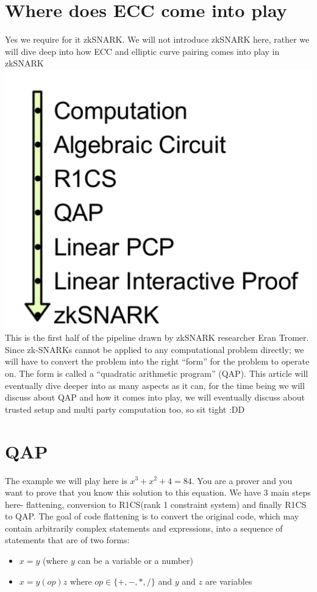 \documentclass[12pt,letterpaper]{article}
\begin{document}
\section{Where does ECC come into play}
Yes we require for it zkSNARK. We will not introduce zkSNARK here, rather we will dive deep into how ECC and elliptic curve pairing comes into play in zkSNARK\\
\includegraphics[scale=0.7]{Eren.PNG}\\
This is the first half of the pipeline drawn by zkSNARK researcher Eran Tromer. Since zk-SNARKs cannot be applied to any computational problem directly; we will have to convert the problem into the right “form” for the problem to operate on. The form is called a “quadratic arithmetic program” (QAP). This article will eventually dive deeper into as many aspects as it can, for the time being we will discuss about QAP and how it comes into play, we will eventually discuss about trusted setup and multi party computation too, so sit tight :DD 
\section{QAP}
The example we will play here is $x^3+x^2+4=84$. You are a prover and you want to prove that you know this solution to this equation. We have 3 main steps here- flattening, conversion to R1CS(rank 1 constraint system) and finally R1CS to QAP. The goal of code flattening is to convert the original code, which may contain arbitrarily complex statements and expressions, into a sequence of statements that are of two forms:
\begin{itemize}
    \item $x=y$ (where $y$ can be a variable or a number)
    \item $x= y (op) z$ where $op\in\{+,-,*,/\}$ and $y$ and $z$ are variables
\end{itemize}
\end{document}
